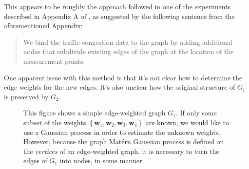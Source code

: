 This appears to be roughly the approach followed in one of the experiments described in Appendix A of \cite{pmlr-v130-borovitskiy21a}, as suggested by the following sentence from the aforementioned Appendix:

\begin{quote}
    We bind the traffic congestion data to the graph by adding additional nodes that subdivide existing edges of the graph at the location of the measurement points.
\end{quote}

One apparent issue with this method is that it's not clear how to determine the edge weights for the new edges. It's also unclear how the original structure of $G_1$ is preserved by $G_2$.

\begin{figure}
    \begin{center}
    \end{center}
    \caption{This figure shows a simple edge-weighted graph $G_1$. If only some subset of the weights $\left\{ \mathbf w_1, \mathbf w_2, \mathbf w_3, \mathbf w_4 \right\}$ are known, we would like to use a Gaussian process in order to estimate the unknown weights. However, because the graph Mat\'{e}rn Gaussian process is defined on the \textit{vertices} of an edge-weighted graph, it is necessary to turn the edges of $G_1$ into nodes, in some manner.}
    \label{fig:add_nodes_1}
\end{figure}

